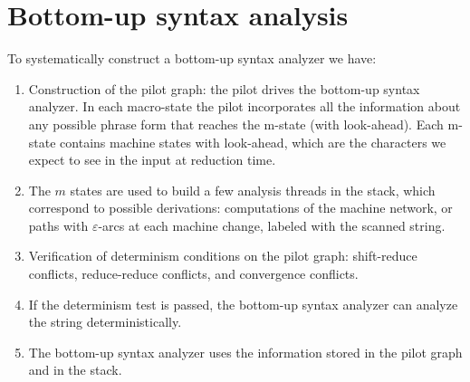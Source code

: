 \section{Bottom-up syntax analysis}

To systematically construct a bottom-up syntax analyzer we have: 
\begin{enumerate}
    \item Construction of the pilot graph: the pilot drives the bottom-up syntax analyzer. 
        In each macro-state the pilot incorporates all the information about any possible phrase form that reaches the m-state (with look-ahead). 
        Each m-state contains machine states with look-ahead, which are the characters we expect to see in the input at reduction time.
    \item The $m$ states are used to build a few analysis threads in the stack, which correspond to possible derivations: computations of the machine network, or paths with $\varepsilon$-arcs at each machine change, labeled with the scanned string. 
    \item Verification of determinism conditions on the pilot graph: shift-reduce conflicts, reduce-reduce conflicts, and convergence conflicts. 
    \item If the determinism test is passed, the bottom-up syntax analyzer can analyze the string deterministically.
    \item The bottom-up syntax analyzer uses the information stored in the pilot graph and in the stack. 
\end{enumerate}

